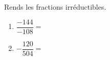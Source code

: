 %
%
    Rends les fractions irréductibles.
    \begin{enumerate}[cols=2]
        \item $\dfrac{-144}{-108}=$
        \item $-\dfrac{120}{504}=$
    \end{enumerate}
    \vspace*{2cm}
